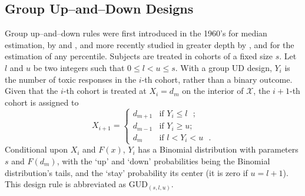 \subsection{Group Up--and--Down Designs}\label{sec:gud}

Group up--and--down rules were first introduced in the 1960's for median estimation, by \cite{Weth:Sequ:1963} and \cite{Tsut:asym:1967,Tsut:rand:1967}, and more recently studied in greater depth by \cite{Gezm:Flou:Grou:2006}, \cite{Ivan:esca:2006} and \cite{Bald:Bort:Giov:2008} for the estimation of any percentile. Subjects are treated in cohorts of a fixed size $s$. Let $l$ and $u$ be two integers such that $0\le l< u\le s$. With a group UD design, $Y_i$ is the number of toxic responses in the $i$-th cohort, rather than a binary outcome. Given that the $i$-th cohort is treated at $X_i=d_m$ on the interior of $\mathcal{X}$, the $i+1$-th cohort is assigned to
%
\begin{equation*}
X_{i+1}=
\begin{cases}
d_{m+1} &\textrm{if $Y_i\le l$ };\\
d_{m-1} &\textrm{if $Y_i\ge u$};\\
d_m &\textrm{if $l<Y_i<u$ }.
\end{cases}
\end{equation*}
%
Conditional upon $X_i$ and $F(x)$, $Y_i$ has a Binomial distribution with parameters $s$ and $F(d_m)$, with the `up' and `down' probabilities being the Binomial distribution's tails, and the `stay' probability its center (it is zero if $u=l+1$). This design rule is abbreviated as GUD$_{(s,l,u)}$.

